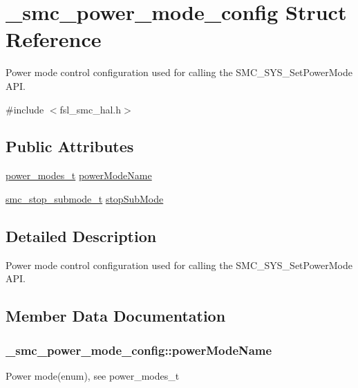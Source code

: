 \hypertarget{struct__smc__power__mode__config}{}\section{\+\_\+smc\+\_\+power\+\_\+mode\+\_\+config Struct Reference}
\label{struct__smc__power__mode__config}


Power mode control configuration used for calling the S\+M\+C\+\_\+\+S\+Y\+S\+\_\+\+Set\+Power\+Mode A\+PI.  




{\ttfamily \#include $<$fsl\+\_\+smc\+\_\+hal.\+h$>$}

\subsection*{Public Attributes}
\begin{DoxyCompactItemize}
\item 
\hyperlink{group__smc__hal_gaabb544d3244b2616aba0a5dca3e18341}{power\+\_\+modes\+\_\+t} \hyperlink{struct__smc__power__mode__config_a2f8ebbf9e02dbb6c230026e5ef56924a}{power\+Mode\+Name}
\item 
\hyperlink{group__smc__hal_ga320ac5c2c75de55f308be3f6735e0268}{smc\+\_\+stop\+\_\+submode\+\_\+t} \hyperlink{struct__smc__power__mode__config_a8e79865913dbec245cbb398252f4aa35}{stop\+Sub\+Mode}
\end{DoxyCompactItemize}


\subsection{Detailed Description}
Power mode control configuration used for calling the S\+M\+C\+\_\+\+S\+Y\+S\+\_\+\+Set\+Power\+Mode A\+PI. 

\subsection{Member Data Documentation}
\subsubsection[{\texorpdfstring{power\+Mode\+Name}{powerModeName}}]{ \+\_\+smc\+\_\+power\+\_\+mode\+\_\+config\+::power\+Mode\+Name}\hypertarget{struct__smc__power__mode__config_a2f8ebbf9e02dbb6c230026e5ef56924a}{}\label{struct__smc__power__mode__config_a2f8ebbf9e02dbb6c230026e5ef56924a}
Power mode(enum), see power\+\_\+modes\+\_\+t 
